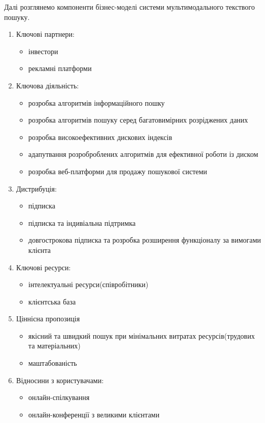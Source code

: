 Далі розглянемо компоненти бізнес-моделі системи мультимодального текствого пошуку.\\
\begin{enumerate}
  \item Ключові партнери:
  \begin{itemize}
          \item інвестори
          \item рекламні платформи
        \end{itemize}
      \item Ключова діяльність:
\begin{itemize}
  \item розробка алгоритмів інформаційного пошку
  \item розробка алгоритмів пошуку серед багатовимірних розріджених даних
  \item розробка високоефективних дискових індексів
  \item адапутвання розроброблених алгоритмів для ефективної роботи із диском
  \item розробка веб-платформи для продажу пошукової системи
\end{itemize}
\item Дистрибуція:
\begin{itemize}
  \item підписка
  \item підписка та індивіальна підтримка
  \item довгострокова підписка та розробка розширення функціоналу за вимогами клієнта
\end{itemize}
\item Ключові ресурси:
  \begin{itemize}
    \item інтелектуальні ресурси(співробітники)
    \item клієнтська база
  \end{itemize}
\item Ціннісна пропозиція
  \begin{itemize}
    \item якісний та швидкий пошук при мінімальних витратах ресурсів(трудових та матеріальних)
    \item маштабованість
  \end{itemize}
\item Відносини з користувачами:
  \begin{itemize}
    \item онлайн-спілкування
    \item онлайн-конференції з великими клієнтами

\end{itemize}
\end{enumerate}
